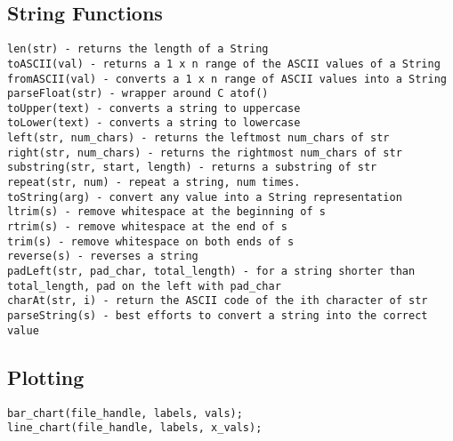 \subsection{String Functions}
\begin{lstlisting}
len(str) - returns the length of a String
toASCII(val) - returns a 1 x n range of the ASCII values of a String
fromASCII(val) - converts a 1 x n range of ASCII values into a String
parseFloat(str) - wrapper around C atof()
toUpper(text) - converts a string to uppercase
toLower(text) - converts a string to lowercase
left(str, num_chars) - returns the leftmost num_chars of str
right(str, num_chars) - returns the rightmost num_chars of str
substring(str, start, length) - returns a substring of str
repeat(str, num) - repeat a string, num times.
toString(arg) - convert any value into a String representation
ltrim(s) - remove whitespace at the beginning of s
rtrim(s) - remove whitespace at the end of s
trim(s) - remove whitespace on both ends of s
reverse(s) - reverses a string
padLeft(str, pad_char, total_length) - for a string shorter than total_length, pad on the left with pad_char
charAt(str, i) - return the ASCII code of the ith character of str
parseString(s) - best efforts to convert a string into the correct value
\end{lstlisting}

\subsection{Plotting}
\begin{lstlisting}
bar_chart(file_handle, labels, vals);
line_chart(file_handle, labels, x_vals);
\end{lstlisting}

